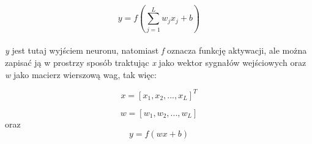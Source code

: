 \documentclass[a4paper, 12pt]{article}
\begin{document}
\begin{equation}
y = f \left( {\sum_{j=1}^{L}  w_j x_j + b } \right)
\label{Eq:2.1}
\end{equation}\\
\textit{y} jest tutaj wyjściem neuronu, natomiast \textit{f} oznacza funkcję aktywacji, ale można zapisać ją w prostrzy sposób traktując \textit{x} jako wektor sygnałów wejściowych oraz \textit{w} jako macierz wierszową wag\cite {book4},  tak więc:

\begin{equation}
x = [x_1, x_2, ..., x_L]^T
\label{Eq:2.2}
\end{equation}

\begin{equation}
w = [w_1, w_2, ..., w_L]
\label{Eq:2.3}
\end{equation}
oraz
\begin{equation}
y = f \left( {wx + b } \right)
\label{Eq:2.4}
\end{equation}\\
\end{document}
